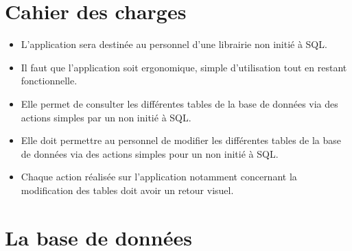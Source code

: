 \documentclass[10pt,a4paper,parskip=full*,DIV=11]{scrartcl}
\begin{document}
\section{Cahier des charges}

\begin{itemize}
    \item L’application sera destinée au personnel d’une librairie non initié à SQL.
    \item Il faut que l'application soit ergonomique, simple d'utilisation tout en restant fonctionnelle.
    \item Elle permet de consulter les différentes tables de la base de données via des actions simples par un non initié à SQL.
    \item Elle doit permettre au personnel de modifier les différentes tables de la base de données via des actions simples pour un non initié à SQL.
    \item Chaque action réalisée sur l'application notamment concernant la modification des tables doit avoir un retour visuel.
\end{itemize}


\section{La base de données}
\end{document}
